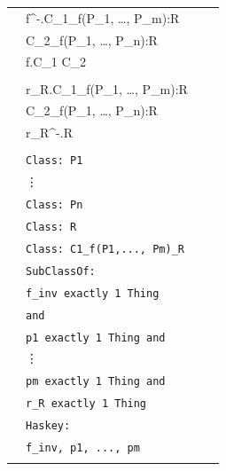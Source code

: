 \begin{longtable}{|>{\scriptsize}c|>{\scriptsize}l|>{\scriptsize}l|>{\scriptsize}p{0.8cm}|}
\begin{minipage}{\dltablespacing}
\begin{aligned}
  	&\exists f^-.\top \sqsubseteq C_{1_{f(P_1, \ldots, P_m):R}} \\
  	&\sqcup C_{2_{f(P_1, \ldots, P_n):R}}   \\
  	&\exists f.\top \sqsubseteq C_1 \sqcup C_2 \\
  	\\
  	&\exists r_R.\top \sqsubseteq C_{1_{f(P_1, \ldots, P_m):R}} \\
  	&\sqcup C_{2_{f(P_1, \ldots, P_n):R}}\\
	&\exists r_R^-.\top \sqsubseteq R\\
	\\
     \end{aligned}$
     Note that determinism of the return values is not enforced.\linebreak 
      \end{minipage}
    &
      $\begin{aligned} 
	&\texttt{Class: P1} \\[\owlspacing]
	&\texttt{\hspace*{6mm}} \vdots \\[\owlspacing]
	&\texttt{Class: Pn} \\[\owlspacing]
	&\texttt{Class: R} \\[\owlspacing]
  	&\texttt{Class: C1\_f(P1,..., Pm)\_R} \\[\owlspacing]
  	&\texttt{\hspace*{2mm}SubClassOf:}\\[\owlspacing]
  	&\texttt{\hspace*{4mm}f\_inv exactly 1 Thing}\\[\owlspacing]
  	&\texttt{\hspace*{6mm}and}\\[\owlspacing]
  	&\texttt{\hspace*{4mm}p1 exactly 1 Thing and}\\[\owlspacing]
  	&\texttt{\hspace*{6mm}} \vdots \\[\owlspacing]
  	&\texttt{\hspace*{4mm}pm exactly 1 Thing and}\\[\owlspacing]
  	&\texttt{\hspace*{4mm}r\_R exactly 1 Thing}\\[\owlspacing]
         &\texttt{\hspace*{2mm}Haskey:}\\[\owlspacing] 
         &\texttt{\hspace*{4mm}f\_inv, p1, ..., pm}\\[\owlspacing]   	

\end{aligned}
\end{longtable}
